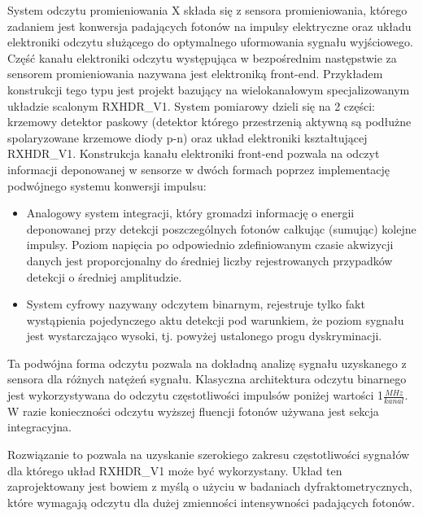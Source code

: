 System odczytu promieniowania X składa się z sensora promieniowania, którego zadaniem jest konwersja padających fotonów na impulsy elektryczne oraz układu elektroniki odczytu służącego do optymalnego uformowania  sygnału wyjściowego. Część kanału elektroniki odczytu występująca w bezpośrednim następstwie za sensorem promieniowania nazywana jest elektroniką front-end.
Przykładem konstrukcji tego typu jest projekt bazujący na wielokanałowym specjalizowanym układzie scalonym RXHDR\_V1. System pomiarowy dzieli się na 2 części: krzemowy detektor paskowy (detektor którego przestrzenią aktywną są podłużne spolaryzowane krzemowe diody p-n) \cite{master} \cite{front-end} oraz układ elektroniki kształtującej RXHDR\_V1. Konstrukcja kanału elektroniki front-end pozwala na odczyt informacji deponowanej w sensorze w dwóch formach poprzez implementację podwójnego systemu konwersji impulsu:
\begin{itemize}
        \item Analogowy system integracji, który gromadzi informację o energii deponowanej przy detekcji poszczególnych fotonów całkując (sumując) kolejne impulsy. Poziom napięcia po odpowiednio zdefiniowanym czasie akwizycji danych jest proporcjonalny do średniej liczby rejestrowanych przypadków detekcji o średniej amplitudzie. 
        \item System cyfrowy nazywany odczytem binarnym, rejestruje tylko fakt wystąpienia pojedynczego aktu detekcji pod warunkiem, że poziom sygnału jest wystarczająco wysoki, tj. powyżej ustalonego progu dyskryminacji.
\end{itemize} 

Ta podwójna forma odczytu pozwala na dokładną analizę sygnału uzyskanego z sensora dla różnych natężeń sygnału. Klasyczna architektura odczytu binarnego jest wykorzystywana do odczytu częstotliwości impulsów poniżej wartości 1$\frac{MHz}{kanal}$. W razie konieczności odczytu wyższej fluencji fotonów używana jest sekcja integracyjna. 

Rozwiązanie to pozwala na uzyskanie szerokiego zakresu częstotliwości sygnałów dla którego układ RXHDR\_V1 może być wykorzystany.
Układ ten zaprojektowany jest bowiem z myślą o użyciu w badaniach dyfraktometrycznych, które wymagają odczytu dla dużej zmienności intensywności padających fotonów. 

